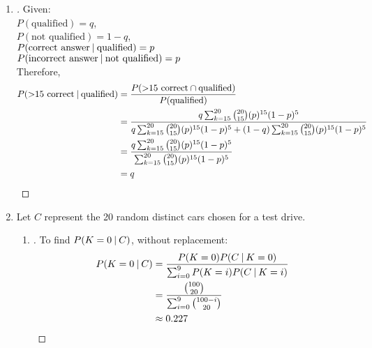 \documentclass[paper=usletter, fontsize=12pt]{article}
\begin{document}
\begin{enumerate}
        \item
        \begin{proof}[\unskip\nopunct]
            Given: \\
            $P(\text{qualified}) = q$,\\
            $P(\text{not qualified}) = 1-q$,\\
            $P(\text{correct answer} \:\vert\: \text{qualified}) = p$ \\
            $P(\text{incorrect answer} \:\vert\: \text{not qualified}) = p$ \\
            Therefore,
            \begingroup
            \addtolength{\jot}{1em}
            \begin{align*}
                P(\text{>15 correct} \:\vert\: \text{qualified}) & = \frac{P(\text{>15 correct} \cap \text{qualified})}{P(\text{qualified})} \\
                & = \frac{q \sum_{k=15}^{20} \binom{20}{15}(p)^{15}(1-p)^5}{q\sum_{k=15}^{20} \binom{20}{15}(p)^{15}(1-p)^5 + (1-q)\sum_{k=15}^{20} \binom{20}{15}(p)^{15}(1-p)^5} \\
                & = \frac{q \sum_{k=15}^{20} \binom{20}{15}(p)^{15}(1-p)^5}{\sum_{k=15}^{20} \binom{20}{15}(p)^{15}(1-p)^5} \\
                & = q \qedhere
            \end{align*}
            \endgroup
        \end{proof}
        \vspace{0.2in}

        \item Let $C$ represent the 20 random distinct cars chosen for a
        test drive.

            \begin{enumerate}

                \item
                \begin{proof}[\unskip\nopunct]
                    To find $P(K=0 \:\vert\: C)$, without replacement:
                    \begingroup
                    \addtolength{\jot}{1em}
                    \begin{align*}
                        P(K=0 \:\vert\: C) & = \frac{P(K=0)P(C \:\vert\: K=0)}{\sum_{i=0}^{9}P(K=i)P(C \:\vert\: K=i)} \\
                        & = \frac{\binom{100}{20}}{\sum_{i=0}^{9}\binom{100-i}{20}}\\
                        & \approx 0.227 \qedhere
                    \end{align*}
                    \endgroup
                \end{proof}
                \vspace{0.2in}


\end{enumerate}
\end{enumerate}
\end{document}
